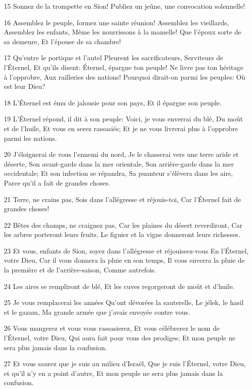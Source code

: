 \par 15 Sonnez de la trompette en Sion! Publiez un jeûne, une convocation solennelle!
\par 16 Assemblez le peuple, formez une sainte réunion! Assemblez les vieillards, Assemblez les enfants, Même les nourrissons à la mamelle! Que l'époux sorte de sa demeure, Et l'épouse de sa chambre!
\par 17 Qu'entre le portique et l'autel Pleurent les sacrificateurs, Serviteurs de l'Éternel, Et qu'ils disent: Éternel, épargne ton peuple! Ne livre pas ton héritage à l'opprobre, Aux railleries des nations! Pourquoi dirait-on parmi les peuples: Où est leur Dieu?
\par 18 L'Éternel est ému de jalousie pour son pays, Et il épargne son peuple.
\par 19 L'Éternel répond, il dit à son peuple: Voici, je vous enverrai du blé, Du moût et de l'huile, Et vous en serez rassasiés; Et je ne vous livrerai plus à l'opprobre parmi les nations.
\par 20 J'éloignerai de vous l'ennemi du nord, Je le chasserai vers une terre aride et déserte, Son avant-garde dans la mer orientale, Son arrière-garde dans la mer occidentale; Et son infection se répandra, Sa puanteur s'élèvera dans les airs, Parce qu'il a fait de grandes choses.
\par 21 Terre, ne crains pas, Sois dans l'allégresse et réjouis-toi, Car l'Éternel fait de grandes choses!
\par 22 Bêtes des champs, ne craignez pas, Car les plaines du désert reverdiront, Car les arbres porteront leurs fruits, Le figuier et la vigne donneront leurs richesses.
\par 23 Et vous, enfants de Sion, soyez dans l'allégresse et réjouissez-vous En l'Éternel, votre Dieu, Car il vous donnera la pluie en son temps, Il vous enverra la pluie de la première et de l'arrière-saison, Comme autrefois.
\par 24 Les aires se rempliront de blé, Et les cuves regorgeront de moût et d'huile.
\par 25 Je vous remplacerai les années Qu'ont dévorées la sauterelle, Le jélek, le hasil et le gazam, Ma grande armée que j'avais envoyée contre vous.
\par 26 Vous mangerez et vous vous rassasierez, Et vous célébrerez le nom de l'Éternel, votre Dieu, Qui aura fait pour vous des prodiges; Et mon peuple ne sera plus jamais dans la confusion.
\par 27 Et vous saurez que je suis au milieu d'Israël, Que je suis l'Éternel, votre Dieu, et qu'il n'y en a point d'autre, Et mon peuple ne sera plus jamais dans la confusion.
